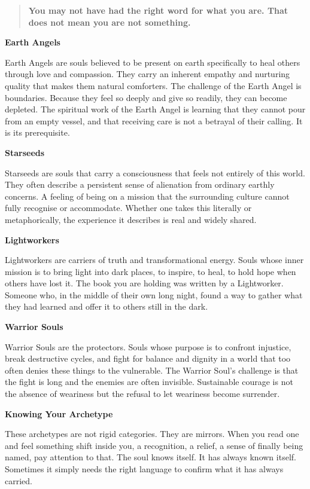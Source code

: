 \begin{quote}
\textbf{You may not have had the right word for what you are. That does
not mean you are not something.}
\end{quote}

\textbf{Earth Angels}

Earth Angels are souls believed to be present on earth specifically to
heal others through love and compassion. They carry an inherent empathy
and nurturing quality that makes them natural comforters. The challenge
of the Earth Angel is boundaries. Because they feel so deeply and give
so readily, they can become depleted. The spiritual work of the Earth
Angel is learning that they cannot pour from an empty vessel, and that
receiving care is not a betrayal of their calling. It is its
prerequisite.

\textbf{Starseeds}

Starseeds are souls that carry a consciousness that feels not entirely
of this world. They often describe a persistent sense of alienation from
ordinary earthly concerns. A feeling of being on a mission that the
surrounding culture cannot fully recognise or accommodate. Whether one
takes this literally or metaphorically, the experience it describes is
real and widely shared.

\textbf{Lightworkers}

Lightworkers are carriers of truth and transformational energy. Souls
whose inner mission is to bring light into dark places, to inspire, to
heal, to hold hope when others have lost it. The book you are holding
was written by a Lightworker. Someone who, in the middle of their own
long night, found a way to gather what they had learned and offer it to
others still in the dark.

\textbf{Warrior Souls}

Warrior Souls are the protectors. Souls whose purpose is to confront
injustice, break destructive cycles, and fight for balance and dignity
in a world that too often denies these things to the vulnerable. The
Warrior Soul's challenge is that the fight is long and the enemies are
often invisible. Sustainable courage is not the absence of weariness but
the refusal to let weariness become surrender.

\textbf{Knowing Your Archetype}

These archetypes are not rigid categories. They are mirrors. When you
read one and feel something shift inside you, a recognition, a relief, a
sense of finally being named, pay attention to that. The soul knows
itself. It has always known itself. Sometimes it simply needs the right
language to confirm what it has always carried.


